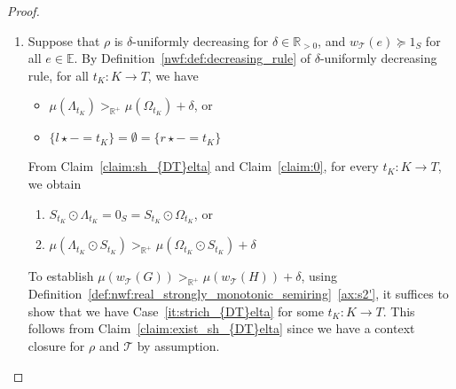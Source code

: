 \begin{proof}
\begin{enumerate}
        \item  
            Suppose that $\rho$ is $\delta$-uniformly decreasing for $\delta \in \mathbb{R}_{>0}$, and $w_\mathcal{T}(e) \succeq 1_S$ for all $e \in \mathbb{E}$. By Definition~\ref{nwf:def:decreasing_rule} of $\delta$-uniformly decreasing rule,
            for all $t_K : K \to T$, we have  
                            \begin{itemize}                                
                                \item $\mu(\Lambda_{t_K}) >_{\mathbb{R}^+} \mu(\Omega_{t_K}) + \delta$,
                                 or
                                \item $\{l \star - = t_K\} = \emptyset = \{r \star - = t_K\}$
                            \end{itemize}
            From Claim~\ref{claim:sh_{DT}elta} and Claim~\ref{claim:0}, for every \( t_K: K \rightarrow T \), we obtain
            \begin{enumerate}[label=(\roman*)]
                \item $S_{t_K} \odot \Lambda_{t_K} = 0_S =  S_{t_K} \odot \Omega_{t_K}$, or
                \item  \label{it:strich_{DT}elta}  $\mu(\Lambda_{t_K} \odot S_{t_K}) >_{\mathbb{R}^+} \mu(\Omega_{t_K} \odot S_{t_K}) + \delta$
            \end{enumerate}
            To establish $ \mu(w_\mathcal{T}(G)) >_{\mathbb{R}^+} \mu(w_\mathcal{T}(H)) + \delta$, using Definition~\ref{def:nwf:real_strongly_monotonic_semiring}~\eqref{ax:s2'}, 
            it suffices to show that we have Case~\ref{it:strich_{DT}elta} for some $t_K : K \to T$.
            This follows from Claim~\ref{claim:exist_sh_{DT}elta} since we have a context closure for $\rho$ and $\mathcal{T}$ by assumption.

\end{enumerate}
\end{proof}
